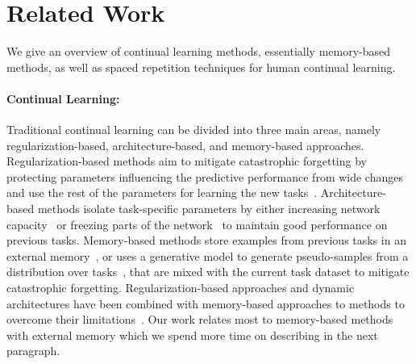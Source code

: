 
\section{Related Work}\label{app:related_work}
We give an overview of continual learning methods, essentially memory-based methods, as well as spaced repetition techniques for human continual learning.

\vspace{-2mm}
\paragraph{Continual Learning:} Traditional continual learning can be divided into three main areas, namely regularization-based, architecture-based, and memory-based approaches. Regularization-based methods aim to mitigate catastrophic forgetting by protecting parameters influencing the predictive performance from wide changes and use the rest of the parameters for learning the new tasks~\cite{adel2019continual, chaudhry2018riemannian, kirkpatrick2017overcoming, li2017learning, nguyen2017variational, rannen2017encoder, schwarz2018progress, zenke2017continual}. Architecture-based methods isolate task-specific parameters by either increasing network capacity~\cite{rusu2016progressive, yoon2019scalable, yoon2017lifelong} or freezing parts of the network~\cite{mallya2018packnet, serra2018overcoming} to maintain good performance on previous tasks. Memory-based methods store examples from previous tasks in an external memory~\cite{chaudhry2019tiny, hayes2020remind, isele2018selective, lopez2017gradient}, or uses a generative model to generate pseudo-samples from a distribution over tasks~\cite{shin2017continual, van2018generative}, that are mixed with the current task dataset to mitigate catastrophic forgetting. Regularization-based approaches and dynamic architectures have been combined with memory-based approaches to methods to overcome their limitations~\cite{chaudhry2018riemannian, chaudhry2018efficient, douillard2020podnet, ebrahimi2020adversarial, joseph2020meta, mirzadeh2020linear, nguyen2017variational, pan2020continual, pellegrini2019latent, rolnick2018experience, von2019continual}. Our work relates most to memory-based methods with external memory which we spend more time on describing in the next paragraph. 



\vspace{-2mm}
